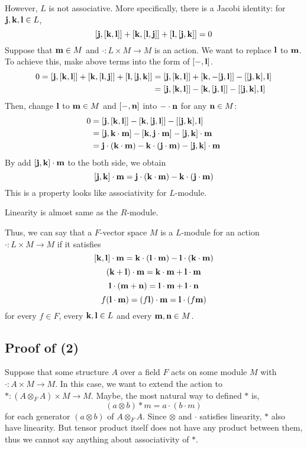 However, \(L\) is not associative.
More specifically, there is a Jacobi identity: for \(\mathbf{j}, \mathbf{k}, \mathbf{l} \in L\),
\[[\mathbf{j}, [\mathbf{k}, \mathbf{l}]] + [\mathbf{k}, [\mathbf{l}, \mathbf{j}]] + [\mathbf{l}, [\mathbf{j}, \mathbf{k}]] = 0\]
Suppose that \(\mathbf{m} \in M\) and \(\cdot: L \times M \to M\) is an action.
We want to replace \(\mathbf{l}\) to \(\mathbf{m}\).
To achieve this, make above terms into the form of \([-, \mathbf{l}]\).
\begin{align*}
  0 =
  [\mathbf{j}, [\mathbf{k}, \mathbf{l}]] + [\mathbf{k}, [\mathbf{l}, \mathbf{j}]] + [\mathbf{l}, [\mathbf{j}, \mathbf{k}]]
  &= [\mathbf{j}, [\mathbf{k}, \mathbf{l}]] + [\mathbf{k}, -[\mathbf{j}, \mathbf{l}]] - [[\mathbf{j}, \mathbf{k}], \mathbf{l}]
  \\&= [\mathbf{j}, [\mathbf{k}, \mathbf{l}]] - [\mathbf{k}, [\mathbf{j}, \mathbf{l}]] - [[\mathbf{j}, \mathbf{k}], \mathbf{l}]
\end{align*}
Then, change \(\mathbf{l}\) to \(\mathbf{m} \in M\)
and \([-, \mathbf{n}]\) into \(- \cdot \mathbf{n}\) for any \(\mathbf{n} \in M\):
\begin{align*}
  0
  &= [\mathbf{j}, [\mathbf{k}, \mathbf{l}]] - [\mathbf{k}, [\mathbf{j}, \mathbf{l}]] - [[\mathbf{j}, \mathbf{k}], \mathbf{l}]
  \\&= [\mathbf{j}, \mathbf{k} \cdot \mathbf{m}] - [\mathbf{k}, \mathbf{j} \cdot \mathbf{m}] - [\mathbf{j}, \mathbf{k}] \cdot \mathbf{m}
  \\&= \mathbf{j} \cdot (\mathbf{k} \cdot \mathbf{m}) - \mathbf{k} \cdot (\mathbf{j} \cdot \mathbf{m}) - [\mathbf{j}, \mathbf{k}] \cdot \mathbf{m}
\end{align*}
By add \([\mathbf{j}, \mathbf{k}] \cdot \mathbf{m}\) to the both side, we obtain
\[[\mathbf{j}, \mathbf{k}] \cdot \mathbf{m} = \mathbf{j} \cdot (\mathbf{k} \cdot \mathbf{m}) - \mathbf{k} \cdot (\mathbf{j} \cdot \mathbf{m})\]
This is a property looks like associativity for \(L\)-module.

Linearity is almost same as the \(R\)-module.

Thus, we can say that
a \(F\)-vector space \(M\) is a \(L\)-module
for an action \(\cdot: L \times M \to M\)
if it satisfies
\[[\mathbf{k}, \mathbf{l}] \cdot \mathbf{m} = \mathbf{k} \cdot (\mathbf{l} \cdot \mathbf{m}) - \mathbf{l} \cdot (\mathbf{k} \cdot \mathbf{m})\]
\[(\mathbf{k} + \mathbf{l}) \cdot \mathbf{m} = \mathbf{k} \cdot \mathbf{m} + \mathbf{l} \cdot \mathbf{m}\]
\[\mathbf{l} \cdot (\mathbf{m} + \mathbf{n}) = \mathbf{l} \cdot \mathbf{m} + \mathbf{l} \cdot \mathbf{n}\]
\[f (\mathbf{l} \cdot \mathbf{m}) = (f \mathbf{l}) \cdot \mathbf{m} = \mathbf{l} \cdot (f \mathbf{m})\]
for every \(f \in F\), every \(\mathbf{k}, \mathbf{l} \in L\) and every \(\mathbf{m}, \mathbf{n} \in M\).

\subsection*{Proof of (2)}

Suppose that some structure \(A\) over a field \(F\) acts on some module \(M\) with \(\cdot: A \times M \to M\).
In this case, we want to extend the action to
\(*: (A \otimes_F A) \times M \to M\).
Maybe, the most natural way to defined \(*\) is,
\[(a \otimes b) * m = a \cdot (b \cdot m) \]
for each generator \((a \otimes b)\) of \(A \otimes_F A\).
Since \(\otimes\) and \(\cdot\) satisfies linearity, \(*\) also have
linearity.
But tensor product itself does not have any product between them,
thus we cannot say anything about associativity of \(*\).

